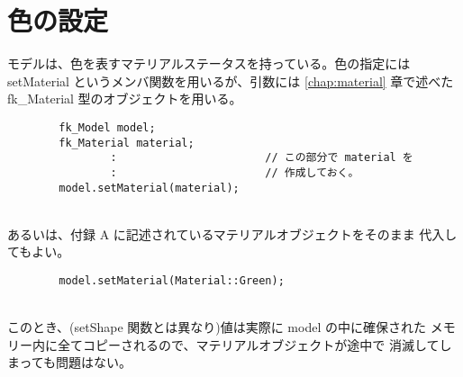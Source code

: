 \section{色の設定}
モデルは、色を表すマテリアルステータスを持っている。色の指定には
setMaterial というメンバ関数を用いるが、引数には \ref{chap:material} 章で述べた
fk\_Material 型のオブジェクトを用いる。
\\
\begin{screen}
\begin{verbatim}
        fk_Model model;
        fk_Material material;
                :                       // この部分で material を
                :                       // 作成しておく。
        model.setMaterial(material);
\end{verbatim}
\end{screen}
~ \\
あるいは、付録 A に記述されているマテリアルオブジェクトをそのまま
代入してもよい。
\\
\begin{screen}
\begin{verbatim}
        model.setMaterial(Material::Green);
\end{verbatim}
\end{screen}
~ \\
このとき、(setShape 関数とは異なり)値は実際に model の中に確保された
メモリー内に全てコピーされるので、マテリアルオブジェクトが途中で
消滅してしまっても問題はない。

